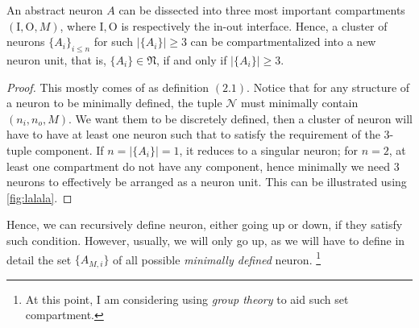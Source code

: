 \begin{proposition}
    An abstract neuron $A$  can be dissected into three most important compartments $(\mathrm{I},\mathrm{O},M)$, where $\mathrm{I},\mathrm{O}$ is respectively the in-out interface. Hence, a cluster of neurons $\{A_{i}\}_{i \leq n}$ for such $\lvert \{ A_{i} \} \rvert \geq 3$ can be compartmentalized into a new neuron unit, that is, $\{ A_{i} \}\in \mathfrak{N}$, if and only if $\lvert \{ A_{i} \} \rvert \geq 3$. 
\end{proposition}

\begin{proof}
    This mostly comes of as definition $(2.1)$. Notice that for any structure of a neuron to be minimally defined, the tuple $\mathcal{N}$ must minimally contain $(n_{i},n_{o},M)$. We want them to be discretely defined, then a cluster of neuron will have to have at least one neuron such that to satisfy the requirement of the 3-tuple component. If $n=\lvert \{ A_{i} \} \rvert=1$, it reduces to a singular neuron; for $n=2$, at least one compartment do not have any component, hence minimally we need 3 neurons to effectively be arranged as a neuron unit. This can be illustrated using \ref{fig:lalala}.
\end{proof}



Hence, we can recursively define neuron, either going up or down, if they satisfy such condition. However, usually, we will only go up, as we will have to define in detail the set $\{ A_{M,i} \}$ of all possible \textit{minimally defined} neuron. \footnote{At this point, I am considering using \textit{group theory} to aid such set compartment.}

